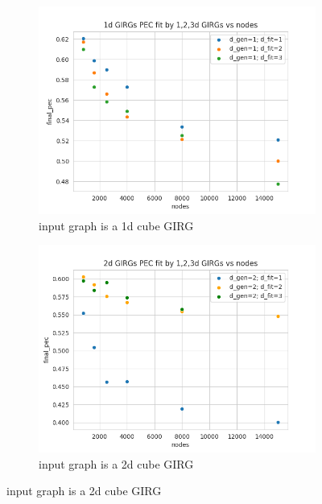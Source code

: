 \begin{figure}
  \centering

  \begin{subfigure}{0.49\textwidth}
    \centering
    \includegraphics[width=\linewidth]{figures/mcmc_ordered_girggen_d_gen1_pecs.png}
    \caption{input graph is a 1d cube GIRG}
  \end{subfigure}
  \hfill
  \begin{subfigure}{0.49\textwidth}
    \centering
    \includegraphics[width=\linewidth]{figures/mcmc_ordered_girggen_d_gen2_pecs.png}
    \caption{input graph is a 2d cube GIRG}
  \end{subfigure}

  \vspace{1em}


\end{figure}
